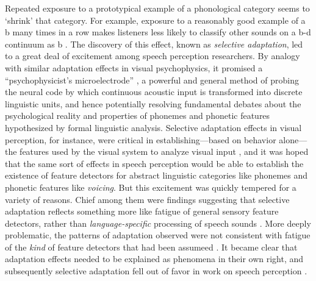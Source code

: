 Repeated exposure to a prototypical example of a phonological category seems to `shrink' that category. For example,  exposure to a reasonably good example of a \ph b many times in a row makes listeners less likely to classify other sounds on a \ph b-\ph d continuum as \ph b \cite{Eimas1973}.  The discovery of this effect, known as \emph{selective adaptation}, led to a great deal of excitement among speech perception researchers.
By analogy with similar adaptation effects in visual psychophysics, it promised a ``psychophysicist's microelectrode'' \cite{Frisby1979,Mollon1974}, a powerful and general method of probing the neural code by which continuous acoustic input is transformed into discrete linguistic units, and hence potentially resolving fundamental debates about the psychological reality and properties of phonemes and phonetic features hypothesized by formal linguistic analysis.  Selective adaptation effects in visual perception, for instance, were critical in establishing---based on behavior alone---the features used by the visual system to analyze visual input \cite[e.g.,][]{Blakemore1969}, and it was hoped that the same sort of effects in speech perception would be able to establish the existence of feature detectors for abstract linguistic categories like phonemes and phonetic features like \emph{voicing}.
But this excitement was quickly tempered for a variety of reasons.  Chief among them were findings suggesting that selective adaptation reflects something more like fatigue of general sensory feature detectors, rather than \emph{language-specific} processing of speech sounds \cite[e.g.,][]{Remez1979,Samuel1979,Schouten1980,Roberts1981}.  \label{r-fd1} More deeply problematic, the patterns of adaptation observed were not consistent with fatigue of the \emph{kind} of feature detectors that had been assumeed \autocite[see ][ for an excellent critique]{Remez1987}.  It became clear that adaptation effects needed to be explained as phenomena in their own right, and subsequently selective adaptation fell out of favor in work on speech perception \cite[cf.][]{Remez1987,Samuel1986}.

